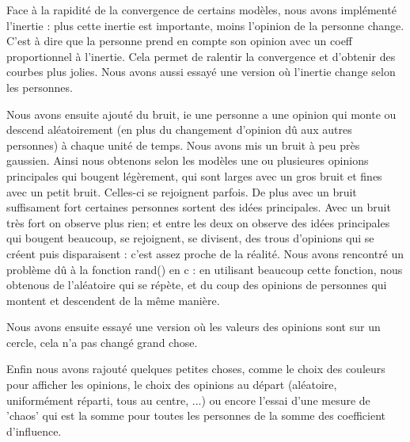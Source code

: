 ﻿\documentclass[a4paper,10pt]{report}
\begin{document}
Face à la rapidité de la convergence de certains modèles, nous avons implémenté l'inertie : plus cette inertie est importante, moins l'opinion de la personne change. C'est à dire que la personne prend en compte son opinion avec un coeff proportionnel à l'inertie. Cela permet de ralentir la convergence et d'obtenir des courbes plus jolies.
Nous avons aussi essayé une version où l'inertie change selon les personnes.

Nous avons ensuite ajouté du bruit, ie une personne a une opinion qui monte ou descend aléatoirement (en plus du changement d'opinion dû aux autres personnes) à chaque unité de temps. Nous avons mis un bruit à peu près gaussien. Ainsi nous obtenons selon les modèles une ou plusieures opinions principales qui bougent légèrement, qui sont larges avec un gros bruit et fines avec un petit bruit. Celles-ci se rejoignent parfois. De plus avec un bruit suffisament fort certaines personnes sortent des idées principales. Avec un bruit très fort on observe plus rien; et entre les deux on observe des idées principales qui bougent beaucoup, se rejoignent, se divisent, des trous d'opinions qui se créent puis disparaisent : c'est assez proche de la réalité.
Nous avons rencontré un problème dû à la fonction rand() en c : en utilisant beaucoup cette fonction, nous obtenous de l'aléatoire qui se répète, et du coup des opinions de personnes qui montent et descendent de la même manière.

Nous avons ensuite essayé une version où les valeurs des opinions sont sur un cercle, cela n'a pas changé grand chose.

Enfin nous avons rajouté quelques petites choses, comme le choix des couleurs pour afficher les opinions, le choix des opinions au départ (aléatoire, uniformément réparti, tous au centre, ...) ou encore l'essai d'une mesure de 'chaos' qui est la somme pour toutes les personnes de la somme des coefficient d'influence.
\end{document}

